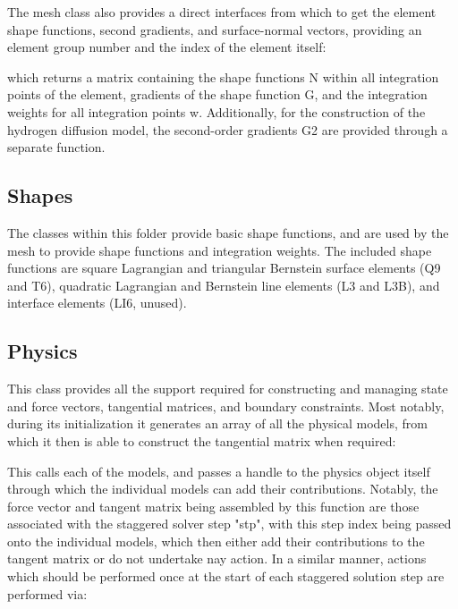\documentclass[3p]{elsarticle} %
\begin{document}
The mesh class also provides a direct interfaces from which to get the element shape functions, second gradients, and surface-normal vectors, providing an element group number and the index of the element itself:

which returns a matrix containing the shape functions N within all integration points of the element, gradients of the shape function G, and the integration weights for all integration points w. Additionally, for the construction of the hydrogen diffusion model, the second-order gradients G2 are provided through a separate function.

\subsection{Shapes}
The classes within this folder provide basic shape functions, and are used by the mesh to provide shape functions and integration weights. The included shape functions are square Lagrangian and triangular Bernstein surface elements (Q9 and T6), quadratic Lagrangian and Bernstein line elements (L3 and L3B), and interface elements (LI6, unused).

\subsection{Physics}
This class provides all the support required for constructing and managing state and force vectors, tangential matrices, and boundary constraints. Most notably, during its initialization it generates an array of all the physical models, from which it then is able to construct the tangential matrix when required:

This calls each of the models, and passes a handle to the physics object itself through which the individual models can add their contributions. Notably, the force vector and tangent matrix being assembled by this function are those associated with the staggered solver step "stp", with this step index being passed onto the individual models, which then either add their contributions to the tangent matrix or do not undertake nay action. In a similar manner, actions which should be performed once at the start of each staggered solution step are performed via:

\end{document}

